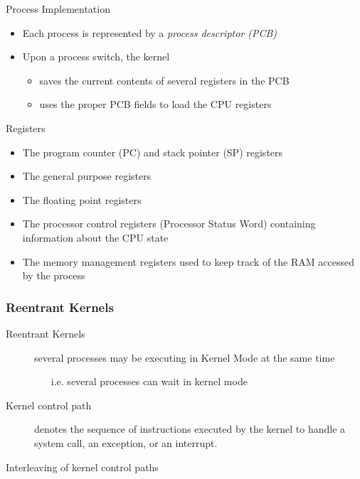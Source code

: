 \begin{frame}
  \begin{block}{Process Implementation}
    \begin{itemize}
    \item Each process is represented by a \emph{process descriptor (PCB)}
    \item Upon a process switch, the kernel
      \begin{itemize}
      \item saves the current contents of several registers in the PCB
      \item uses the proper PCB fields to load the CPU registers
      \end{itemize}
    \end{itemize}
  \end{block}
  \begin{block}{Registers}
    \begin{itemize}
    \item The program counter (PC) and stack pointer (SP) registers
    \item The general purpose registers
    \item The floating point registers
    \item The processor control registers (Processor Status Word) containing information
      about the CPU state
    \item The memory management registers used to keep track of the RAM accessed by the
      process
    \end{itemize}
  \end{block}
\end{frame}

\subsubsection{Reentrant Kernels}

\begin{frame}
  \begin{description}
  \item[Reentrant Kernels] several processes may be executing in Kernel Mode at the same
    time
    \begin{itemize}
    \item[i.e.] several processes can wait in kernel mode
    \end{itemize}
  \item[Kernel control path] denotes the sequence of instructions executed by the kernel
    to handle a system call, an exception, or an interrupt.
  \end{description}
  \begin{block}{Interleaving of kernel control paths}
    \begin{center}
    \end{center}
  \end{block}
\end{frame}


